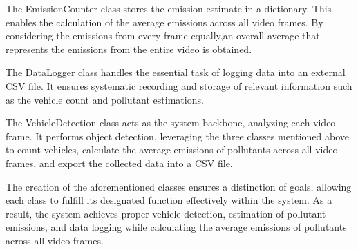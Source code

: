The EmissionCounter class stores the emission estimate in a dictionary. This enables the calculation of the average emissions across all video frames. By considering the emissions from every frame equally,an overall average that represents the emissions from the entire video is obtained.

The DataLogger class handles the essential task of logging data into an external CSV file. It ensures systematic recording and storage of relevant information such as the vehicle count and pollutant estimations.

The VehicleDetection class acts as the system backbone, analyzing each video frame. It performs object detection, leveraging the three classes mentioned above to count vehicles, calculate the average emissions of pollutants across all video frames, and export the collected data into a CSV file.

The creation of the aforementioned classes ensures a distinction of goals, allowing each class to fulfill its designated function effectively within the system. As a result, the system achieves proper vehicle detection, estimation of pollutant emissions, and data logging while calculating the average emissions of pollutants across all video frames.


